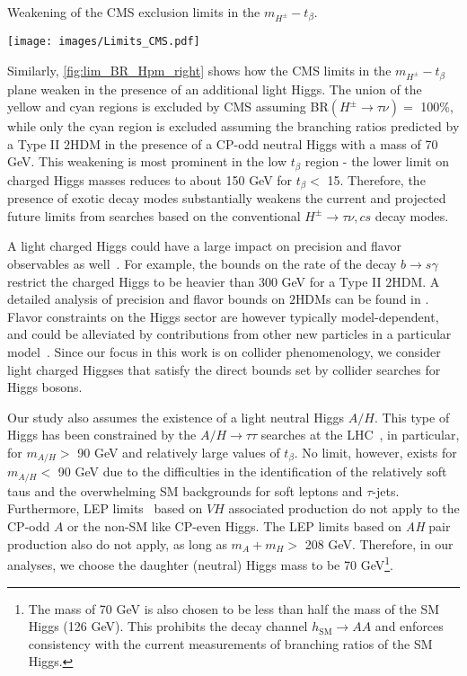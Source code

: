 \begin{marginfigure}[-5cm]
  \caption{Weakening of the CMS exclusion limits in the $m_{H^\pm}-t_\beta$.}
 	\texttt{[image: images/Limits\_CMS.pdf]}
\label{fig:lim_BR_Hpm_right}
\end{marginfigure}
Similarly, \autoref{fig:lim_BR_Hpm_right} shows how the CMS limits in the $m_{H^{\pm}}-t_{\beta}$ plane weaken in the presence of an additional light Higgs. The union of the yellow and cyan regions is excluded by CMS assuming BR$(H^{\pm} \rightarrow \tau \nu) =$ 100\%, while only the cyan region is excluded assuming the branching ratios predicted by a Type II $2$HDM in the presence of a CP-odd neutral Higgs with a mass of 70 GeV. This weakening is most prominent in the low $t_\beta$ region - the lower limit on charged Higgs masses reduces to about 150 GeV for $t_{\beta}<$ 15. Therefore, the presence of exotic decay modes substantially weakens the current and projected future limits from searches based on the conventional $H^{\pm} \rightarrow \tau \nu, cs$ decay modes. 

A light charged Higgs could have a large impact on precision and flavor observables as well~\cite{Olive:2016xmw}. For example, the bounds on the rate of the decay $b\rightarrow s\gamma$ restrict the charged Higgs to be heavier than 300 GeV for a Type II $2$HDM. A detailed analysis of precision and flavor bounds on $2$HDMs can be found in \cite{Coleppa:2013dya,Mahmoudi:2009zx}. Flavor constraints on the Higgs sector are however typically model-dependent, and could be alleviated by contributions from other new particles in a particular model~\cite{Han:2013mga}. Since our focus in this work is on collider phenomenology, we consider light charged Higgses that satisfy the direct bounds set by collider searches for Higgs bosons.

Our study also assumes the existence of a light neutral Higgs $A/H$. This type of Higgs has been constrained by the $A/H \rightarrow \tau\tau$ searches at the LHC~\cite{Khachatryan:2014wca,Aad:2014vgg}, in particular, for $m_{A/H}>$ 90 GeV and relatively large values of $t_{\beta}$. No limit, however, exists for $m_{A/H}<$ 90 GeV due to the difficulties in the identification of the relatively soft taus and the overwhelming SM backgrounds for soft leptons and $\tau$-jets. Furthermore, LEP limits~\cite{LEP_Higgs} based on $VH$ associated production do not apply to the CP-odd $A$ or the non-SM like CP-even Higgs. The LEP limits based on \emph{AH} pair production also do not apply, as long as $m_A+m_H>$ 208 GeV. Therefore, in our analyses, we choose the daughter (neutral) Higgs mass to be 70 GeV\footnote{The mass of 70 GeV is also chosen to be less than half the mass of the SM Higgs (126 GeV). This prohibits the decay channel $h_\text{SM} \rightarrow AA$ and enforces consistency with the current measurements of branching ratios of the SM Higgs.}.

